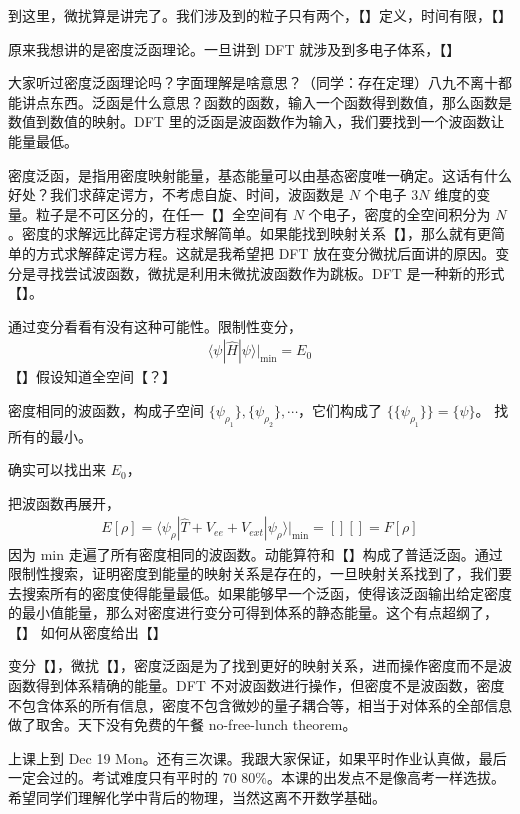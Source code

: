 到这里，微扰算是讲完了。我们涉及到的粒子只有两个，【】定义，时间有限，【】

原来我想讲的是密度泛函理论。一旦讲到 DFT 就涉及到多电子体系，【】

大家听过密度泛函理论吗？字面理解是啥意思？（同学：存在定理）八九不离十都能讲点东西。泛函是什么意思？函数的函数，输入一个函数得到数值，那么函数是数值到数值的映射。DFT 里的泛函是波函数作为输入，我们要找到一个波函数让能量最低。

密度泛函，是指用密度映射能量，基态能量可以由基态密度唯一确定。这话有什么好处？我们求薛定谔方，不考虑自旋、时间，波函数是 $N$ 个电子 $3N$ 维度的变量。粒子是不可区分的，在任一【】全空间有 $N$ 个电子，密度的全空间积分为 $N$。密度的求解远比薛定谔方程求解简单。如果能找到映射关系【】，那么就有更简单的方式求解薛定谔方程。这就是我希望把 DFT 放在变分微扰后面讲的原因。变分是寻找尝试波函数，微扰是利用未微扰波函数作为跳板。DFT 是一种新的形式【】。

通过变分看看有没有这种可能性。限制性变分，
\begin{align}
    \langle \psi | \hat H | \psi \rangle |_{\text{min}} = E_0
\end{align}
【】假设知道全空间【？】

密度相同的波函数，构成子空间 $\{\psi_{\rho_1}\}, \{\psi_{\rho_2}\}, \cdots$，它们构成了 $\{\{\psi_{\rho_1}\}\} = \{\psi\}$。
找所有的最小。

确实可以找出来 $E_0$，

把波函数再展开，
\begin{align}
    E[\rho] = 
\langle    \psi_\rho | \hat T + V_{ee} + V_{ext} | \psi_\rho \rangle | _{\text{min}} = [][] 
= F[\rho]
\end{align}
因为 min 走遍了所有密度相同的波函数。动能算符和【】构成了普适泛函。通过限制性搜索，证明密度到能量的映射关系是存在的，一旦映射关系找到了，我们要去搜索所有的密度使得能量最低。如果能够早一个泛函，使得该泛函输出给定密度的最小值能量，那么对密度进行变分可得到体系的静态能量。这个有点超纲了，【】
如何从密度给出【】

变分【】，微扰【】，密度泛函是为了找到更好的映射关系，进而操作密度而不是波函数得到体系精确的能量。DFT 不对波函数进行操作，但密度不是波函数，密度不包含体系的所有信息，密度不包含微妙的量子耦合等，相当于对体系的全部信息做了取舍。天下没有免费的午餐 no-free-lunch theorem。

上课上到 Dec 19 Mon。还有三次课。我跟大家保证，如果平时作业认真做，最后一定会过的。考试难度只有平时的 70 80\%。本课的出发点不是像高考一样选拔。希望同学们理解化学中背后的物理，当然这离不开数学基础。
